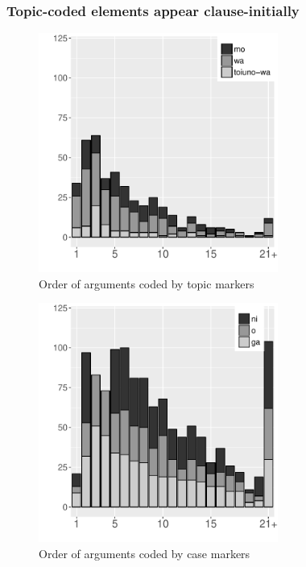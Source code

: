 \subsubsection{Topic-coded elements appear clause-initially}\label{WO:ClauseInit:Ident:Topic}

\begin{figure}
	\begin{center}
	\includegraphics[width=0.7\textwidth]{figure/WOTopPar.pdf}
	\caption{Order of arguments coded by topic markers}
	\label{WOTopParF}
	\end{center}
\end{figure}
\begin{figure}
	\begin{center}
	\includegraphics[width=0.7\textwidth]{figure/WOCasePar.pdf}
	\caption{Order of arguments coded by case markers}
	\label{WOCaseParF}
	\end{center}
\end{figure}

